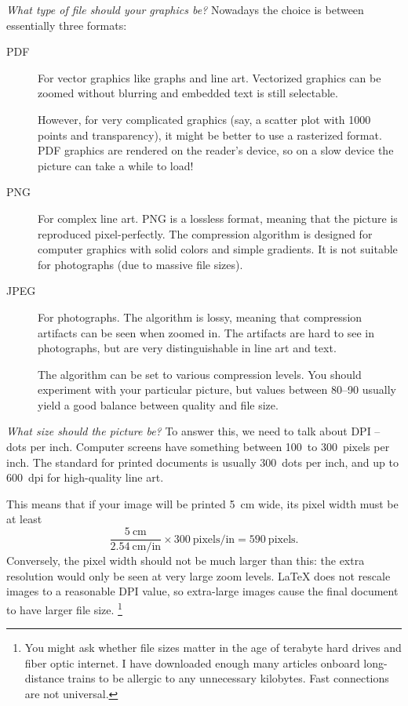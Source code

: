 \bigskip\noindent%
\emph{What type of file should your graphics be?}
Nowadays the choice is between essentially three formats:
\begin{description}
\item[PDF] For vector graphics like graphs and line art.
    Vectorized graphics can be zoomed without blurring
    and embedded text is still selectable.

    However, for very complicated graphics
    (say, a scatter plot with 1000 points and transparency),
    it might be better to use a rasterized format.
    PDF graphics are rendered on the reader's device,
    so on a slow device the picture can take a while to load!
\item[PNG] For complex line art.
    PNG is a lossless format, meaning that the picture is reproduced pixel-perfectly.
    The compression algorithm is designed for computer graphics
    with solid colors and simple gradients.
    It is not suitable for photographs (due to massive file sizes).
\item[JPEG] For photographs.
    The algorithm is lossy, meaning that compression artifacts can be seen when zoomed in.
    The artifacts are hard to see in photographs,
    but are very distinguishable in line art and text.

    The algorithm can be set to various compression levels.
    You should experiment with your particular picture,
    but values between 80--90 usually yield a good balance between quality and file size.
\end{description}


\bigskip\noindent%
\emph{What size should the picture be?}
To answer this, we need to talk about DPI -- dots per inch.
Computer screens have something between 100~to 300~pixels per inch.
The standard for printed documents is usually 300~dots per inch,
and up to 600~dpi for high-quality line art.

This means that if your image will be printed 5~cm wide, its pixel width must be at least
\[
\frac{5~\text{cm}}{2.54~\text{cm/in}} \times 300~\text{pixels/in}
= 590~\text{pixels}.
\]
Conversely, the pixel width should not be much larger than this:
the extra resolution would only be seen at very large zoom levels.
\LaTeX{} does not rescale images to a reasonable DPI value,
so extra-large images cause the final document to have larger file size.%
\footnote{You might ask whether file sizes matter in the age of terabyte hard drives
and fiber optic internet.
I have downloaded enough many articles onboard long-distance trains
to be allergic to any unnecessary kilobytes.
Fast connections are not universal.}

